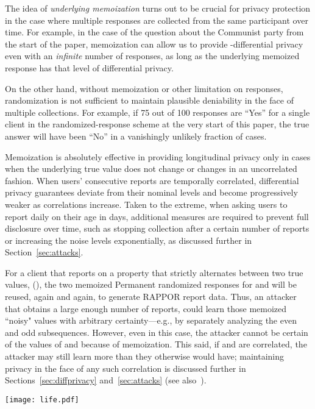 \documentclass{sig-alternate-2013}
\newcommand\RAPPOR{{RAPPOR}}
\begin{document}
The idea of \emph{underlying memoization} turns out to be crucial for privacy protection in the case where multiple responses are collected from the same participant over time. For example, in the case of the question about the Communist party from the start of the paper, memoization can allow us to provide -differential privacy even with an \emph{infinite} number of responses, as long as the underlying memoized response has that level of differential privacy.

On the other hand,
without memoization or other limitation on responses,
randomization is not sufficient to
maintain plausible deniability
in the face of multiple collections.
For example,
if 75 out of 100 responses are ``Yes'' for a single client
in the randomized-response scheme
at the very start of this paper,
the true answer will have been ``No''
in a vanishingly unlikely 
fraction of cases.


Memoization is absolutely effective in providing longitudinal privacy only in cases when the underlying true value does not change
 or changes in an uncorrelated fashion. When users' consecutive reports are temporally correlated, differential privacy guarantees
 deviate from their nominal levels and become progressively weaker as correlations increase. Taken to the extreme, when asking users
 to report daily on their age in days, additional measures are required to prevent full disclosure over time, such as stopping collection after
 a certain number of reports or increasing the noise levels exponentially, 
as discussed further in Section~\ref{sec:attacks}.
 
For a client that reports on a property that strictly alternates between two true values, (), the two memoized Permanent randomized
 responses for  and  will be reused, again and again, to generate \RAPPOR{} report data. Thus, an attacker that obtains a large enough number of reports,
 could learn those memoized ``noisy" values with arbitrary certainty---e.g.,
 by separately analyzing the even and odd subsequences.
However, even in this case, 
the attacker cannot be certain of the values of  and 
because of memoization.
This said,
if  and  are correlated,
the attacker may still learn more
than they otherwise would have;
maintaining privacy in the face of 
any such correlation 
is discussed further in Sections~\ref{sec:diffprivacy} and~\ref{sec:attacks} (see also~\cite{KiferM11}).

\begin{figure*}[!t]
\centering
\texttt{[image: life.pdf]}
\caption{Life of a \RAPPOR{} report: The client value of the string ``The number 68'' is hashed onto the Bloom filter  using  (here 4) hash functions. For this string, a Permanent randomized response  is produces and memoized by the client, and this  is used (and reused in the future) to generate Instantaneous randomized responses  (the bottom row), which are sent to the collecting service.}\vspace*{-2ex}
\label{fig:life}
\end{figure*}
\end{document}
